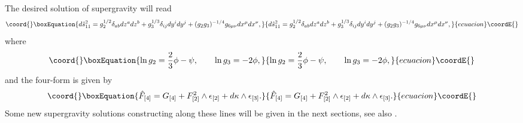 \documentclass[a4paper,12pt]{article}
\begin{document}
The desired solution of \coordHE{} supergravity will read
\begin{equation}\coord{}\boxEquation{\label{aNZ}
d \hat s_{11}^2 = g_2^{1/2} \delta_{ab} dz^a dz^b + g_3^{1/3}
\delta_{ij} dy^i dy^j + (g_2 g_3)^{-1/4} g_{6\mu\nu} dx^\mu
dx^\nu,
}{d \hat s_{11}^2 = g_2^{1/2} \delta_{ab} dz^a dz^b + g_3^{1/3}
\delta_{ij} dy^i dy^j + (g_2 g_3)^{-1/4} g_{6\mu\nu} dx^\mu
dx^\nu,
}{ecuacion}\coordE{}\end{equation}
where
\begin{equation}\coord{}\boxEquation{
\ln g_2 = \frac23 \phi - \psi, \qquad \ln g_3 = -2 \phi,
}{
\ln g_2 = \frac23 \phi - \psi, \qquad \ln g_3 = -2 \phi,
}{ecuacion}\coordE{}\end{equation}
and the \coordHE{} four-form \coordHE{} is given by
\begin{equation}\coord{}\boxEquation{ \label{fANZ}
\hat F_{[4]} = G_{[4]} + F^2_{[2]} \wedge \epsilon_{[2]} +
d\kappa \wedge \epsilon_{[3]}.
}{ \hat F_{[4]} = G_{[4]} + F^2_{[2]} \wedge \epsilon_{[2]} +
d\kappa \wedge \epsilon_{[3]}.
}{ecuacion}\coordE{}\end{equation}
Some new supergravity solutions constructing along these lines
will be given in the next sections, see also
\cite{ChGaSh00,ChGaSh99,Ch00}.
\end{document}
